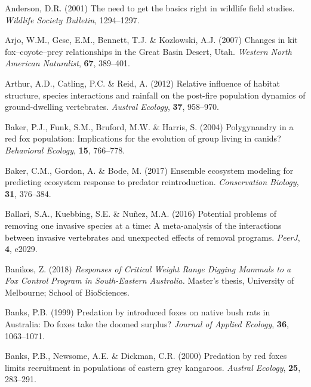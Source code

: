 \documentclass[11pt,a4paper,titlepage,twoside,openright]{style/unimelbthesis}
\begin{document}
\begin{mainmatter}
\leavevmode\hypertarget{ref-anderson2001need}{}%
Anderson, D.R. (2001) The need to get the basics right in wildlife field studies. \emph{Wildlife Society Bulletin}, 1294--1297.

\leavevmode\hypertarget{ref-arjo2007changes}{}%
Arjo, W.M., Gese, E.M., Bennett, T.J. \& Kozlowski, A.J. (2007) Changes in kit fox--coyote--prey relationships in the Great Basin Desert, Utah. \emph{Western North American Naturalist}, \textbf{67}, 389--401.

\leavevmode\hypertarget{ref-arthur2012relative}{}%
Arthur, A.D., Catling, P.C. \& Reid, A. (2012) Relative influence of habitat structure, species interactions and rainfall on the post-fire population dynamics of ground-dwelling vertebrates. \emph{Austral Ecology}, \textbf{37}, 958--970.

\leavevmode\hypertarget{ref-baker2004polygynandry}{}%
Baker, P.J., Funk, S.M., Bruford, M.W. \& Harris, S. (2004) Polygynandry in a red fox population: Implications for the evolution of group living in canids? \emph{Behavioral Ecology}, \textbf{15}, 766--778.

\leavevmode\hypertarget{ref-baker2017ensemble}{}%
Baker, C.M., Gordon, A. \& Bode, M. (2017) Ensemble ecosystem modeling for predicting ecosystem response to predator reintroduction. \emph{Conservation Biology}, \textbf{31}, 376--384.

\leavevmode\hypertarget{ref-ballari2016potential}{}%
Ballari, S.A., Kuebbing, S.E. \& Nuñez, M.A. (2016) Potential problems of removing one invasive species at a time: A meta-analysis of the interactions between invasive vertebrates and unexpected effects of removal programs. \emph{PeerJ}, \textbf{4}, e2029.

\leavevmode\hypertarget{ref-banikos2018responses}{}%
Banikos, Z. (2018) \emph{Responses of Critical Weight Range Digging Mammals to a Fox Control Program in South-Eastern Australia.} Master's thesis, University of Melbourne; School of BioSciences.

\leavevmode\hypertarget{ref-banks1999predation}{}%
Banks, P.B. (1999) Predation by introduced foxes on native bush rats in Australia: Do foxes take the doomed surplus? \emph{Journal of Applied Ecology}, \textbf{36}, 1063--1071.

\leavevmode\hypertarget{ref-banks2000predation}{}%
Banks, P.B., Newsome, A.E. \& Dickman, C.R. (2000) Predation by red foxes limits recruitment in populations of eastern grey kangaroos. \emph{Austral Ecology}, \textbf{25}, 283--291.


\end{mainmatter}
\end{document}
